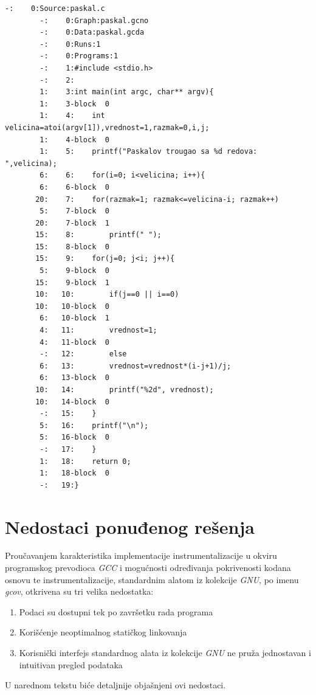 \documentclass[12pt,oneside]{memoir}
\newcommand{\strano}[1]{\textit{#1}}
\begin{document}
\newpage
\begin{lstlisting}[caption={Primer izveštaja koji generiše alat \strano{gcov} sa opcijom -a},frame=single, label=block]
        -:    0:Source:paskal.c
        -:    0:Graph:paskal.gcno
        -:    0:Data:paskal.gcda
        -:    0:Runs:1
        -:    0:Programs:1
        -:    1:#include <stdio.h>
        -:    2:
        1:    3:int main(int argc, char** argv){
        1:    3-block  0
        1:    4:    int velicina=atoi(argv[1]),vrednost=1,razmak=0,i,j;
        1:    4-block  0
        1:    5:    printf("Paskalov trougao sa %d redova: ",velicina);
        6:    6:    for(i=0; i<velicina; i++){
        6:    6-block  0
       20:    7:	for(razmak=1; razmak<=velicina-i; razmak++)
        5:    7-block  0
       20:    7-block  1
       15:    8:	    printf(" ");
       15:    8-block  0
       15:    9:	for(j=0; j<i; j++){
        5:    9-block  0
       15:    9-block  1
       10:   10:	    if(j==0 || i==0)
       10:   10-block  0
        6:   10-block  1
        4:   11:		vrednost=1;
        4:   11-block  0
        -:   12:	    else
        6:   13:		vrednost=vrednost*(i-j+1)/j;
        6:   13-block  0
       10:   14:	    printf("%2d", vrednost);
       10:   14-block  0
        -:   15:	}
        5:   16:	printf("\n");
        5:   16-block  0
        -:   17:    }
        1:   18:    return 0;
        1:   18-block  0
        -:   19:}
\end{lstlisting}

\section{Nedostaci ponuđenog rešenja}


Proučavanjem karakteristika implementacije instrumentalizacije u okviru programskog prevodioca \strano{GCC} i mogućnosti određivanja pokrivenosti kodana osnovu te instrumentalizacije, standardnim alatom iz kolekcije \strano{GNU}, po imenu \strano{gcov}, otkrivena su tri velika nedostatka:

\begin{enumerate}
\item Podaci su dostupni tek po završetku rada programa
\item Korišćenje neoptimalnog statičkog linkovanja
\item Korisnički interfejs standardnog alata iz kolekcije \strano{GNU} ne pruža jednostavan i intuitivan pregled podataka
\end{enumerate}

U narednom tekstu biće detaljnije objašnjeni ovi nedostaci.
\end{document}

